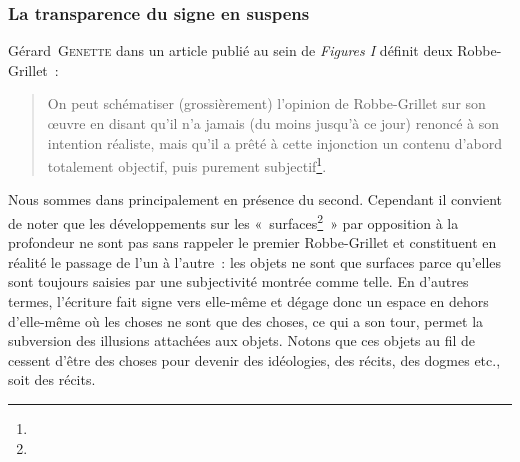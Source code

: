 \documentclass[12pt, a4paper]{article}
\begin{document}
\subsubsection{La transparence du signe en suspens}
\label{signe}


Gérard~\textsc{Genette} dans un article publié au sein de \textit{Figures I} définit deux Robbe-Grillet~:
\begin{quote}
    On peut schématiser (grossièrement) l'opinion de Robbe-Grillet sur son œuvre en disant qu'il n'a jamais (du moins jusqu'à ce jour) renoncé à son intention réaliste, mais qu'il a prêté à cette injonction un contenu d'abord totalement objectif, puis purement subjectif\footnote{}.
\end{quote}
Nous sommes dans \punr{} principalement en présence du second. Cependant il convient de noter que les développements sur les «~surfaces\footnote{}~» par opposition à la profondeur ne sont pas sans rappeler le premier Robbe-Grillet et constituent en réalité le passage de l'un à l'autre~: les objets ne sont que surfaces parce qu'elles sont toujours saisies par une subjectivité montrée comme telle. En d'autres termes, l'écriture fait signe vers elle-même et dégage donc un espace en dehors d'elle-même où les choses ne sont que des choses, ce qui a son tour, permet la subversion des illusions attachées aux objets. Notons que ces objets au fil de \punr{} cessent d'être des choses pour devenir des idéologies, des récits, des dogmes etc., soit des récits.
\end{document}
